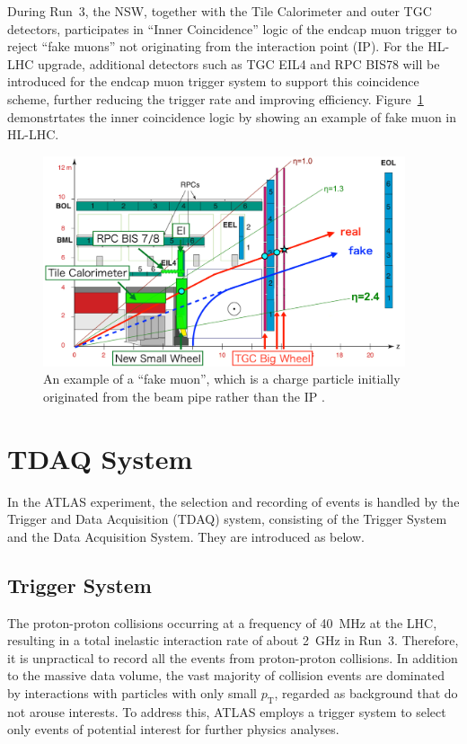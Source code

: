 During Run~3, the NSW, together with the Tile Calorimeter and outer TGC detectors, participates in ``Inner Coincidence'' logic of the endcap muon trigger to reject ``fake muons'' not originating from the interaction point (IP). For the HL-LHC upgrade, additional detectors such as TGC EIL4 and RPC BIS78 will be introduced for the endcap muon trigger system to support this coincidence scheme, further reducing the trigger rate and improving efficiency. Figure~\ref{fig:InnerCoin} demonstrtates the inner coincidence logic by showing an example of fake muon in HL-LHC.

\begin{figure}[htbp]
  \centering
  \includegraphics[width=0.95\textwidth]{figs/chapter2/InnerCoin_new2.png}
  \caption{An example of a ``fake muon'', which is a charge particle initially originated from the beam pipe rather than the IP \cite{InnerCoinPoster}.}
  \label{fig:InnerCoin}
\end{figure}

\section{TDAQ System} \label{sec:TDAQSystem}
In the ATLAS experiment, the selection and recording of events is handled by the Trigger and Data Acquisition (TDAQ) system, consisting of the Trigger System and the Data Acquisition System. They are introduced as below.
\subsection{Trigger System}
The proton-proton collisions occurring at a frequency of 40~MHz at the LHC, resulting in a total inelastic interaction rate of about 2~GHz in Run~3. Therefore, it is unpractical to record all the events from proton-proton collisions. In addition to the massive data volume, the vast majority of collision events are dominated by interactions with particles with only small $p_{\mathrm{T}}$, regarded as background that do not arouse interests. To address this, ATLAS employs a trigger system to select only events of potential interest for further physics analyses.

